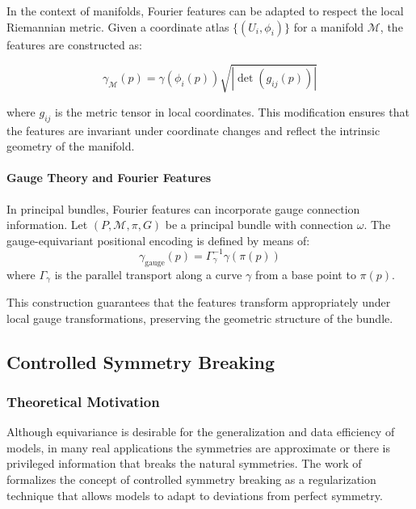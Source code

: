 In the context of manifolds, Fourier features can be adapted to respect the local Riemannian metric. Given a coordinate atlas $\{(U_i, \phi_i)\}$ for a manifold $\mathcal{M}$, the features are constructed as:

\begin{equation}
\gamma_{\mathcal{M}}(p) = \gamma(\phi_i(p)) \sqrt{|\det(g_{ij}(p))|}
\end{equation}

where $g_{ij}$ is the metric tensor in local coordinates. This modification ensures that the features are invariant under coordinate changes and reflect the intrinsic geometry of the manifold.

\paragraph{Gauge Theory and Fourier Features}

In principal bundles, Fourier features can incorporate gauge connection information. Let $(P, \mathcal{M}, \pi, G)$ be a principal bundle with connection $\omega$. The gauge-equivariant positional encoding is defined by means of:
\begin{equation}
\gamma_{\text{gauge}}(p) = \Gamma_\gamma^{-1} \gamma(\pi(p))
\end{equation}
where $\Gamma_\gamma$ is the parallel transport along a curve $\gamma$ from a base point to $\pi(p)$.

This construction guarantees that the features transform appropriately under local gauge transformations, preserving the geometric structure of the bundle.

\subsection{Controlled Symmetry Breaking}

\subsubsection{Theoretical Motivation}

Although equivariance is desirable for the generalization and data efficiency of models, in many real applications the symmetries are approximate or there is privileged information that breaks the natural symmetries. The work of \citet{vanderouderaa2024symmetry} formalizes the concept of controlled symmetry breaking as a regularization technique that allows models to adapt to deviations from perfect symmetry.

